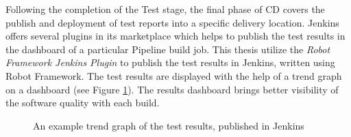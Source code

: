 Following the completion of the Test stage, the final phase of \ac{CD} covers the publish and deployment of test reports into a specific delivery location. Jenkins offers several plugins in its marketplace which helps to publish the test results in the dashboard of a particular Pipeline build job. This thesis utilize the \emph{Robot Framework Jenkins Plugin} to publish the test results in Jenkins, written using Robot Framework. The test results are displayed with the help of a trend graph on a dashboard (see Figure \ref{fig:SampleTrendGraph}). The results dashboard brings better visibility of the software quality with each build.

\vspace{0.5cm}
\begin{figure}[H]
%
\caption[An example of the trend graph]{An example trend graph of the test results, published in Jenkins}
\label{fig:SampleTrendGraph}
\end{figure}
\vspace{0.5cm}




